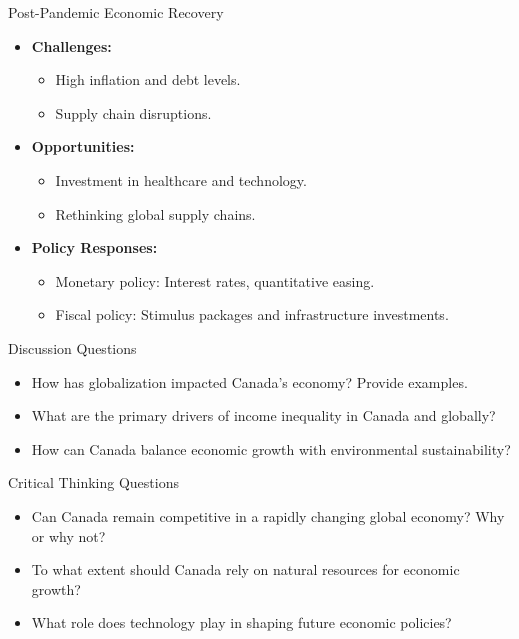 \documentclass{beamer}
\begin{document}
\begin{frame}{Post-Pandemic Economic Recovery}
  \begin{itemize}
    \item \textbf{Challenges:}
      \begin{itemize}
        \item High inflation and debt levels.
        \item Supply chain disruptions.
      \end{itemize}
    \item \textbf{Opportunities:}
      \begin{itemize}
        \item Investment in healthcare and technology.
        \item Rethinking global supply chains.
      \end{itemize}
    \item \textbf{Policy Responses:}
      \begin{itemize}
        \item Monetary policy: Interest rates, quantitative easing.
        \item Fiscal policy: Stimulus packages and infrastructure investments.
      \end{itemize}
  \end{itemize}
\end{frame}

\begin{frame}{Discussion Questions}
  \begin{itemize}
    \item How has globalization impacted Canada’s economy? Provide examples.
    \item What are the primary drivers of income inequality in Canada and globally?
    \item How can Canada balance economic growth with environmental sustainability?
  \end{itemize}
\end{frame}

\begin{frame}{Critical Thinking Questions}
  \begin{itemize}
    \item Can Canada remain competitive in a rapidly changing global economy? Why or why not?
    \item To what extent should Canada rely on natural resources for economic growth?
    \item What role does technology play in shaping future economic policies?
  \end{itemize}
\end{frame}
\end{document}
